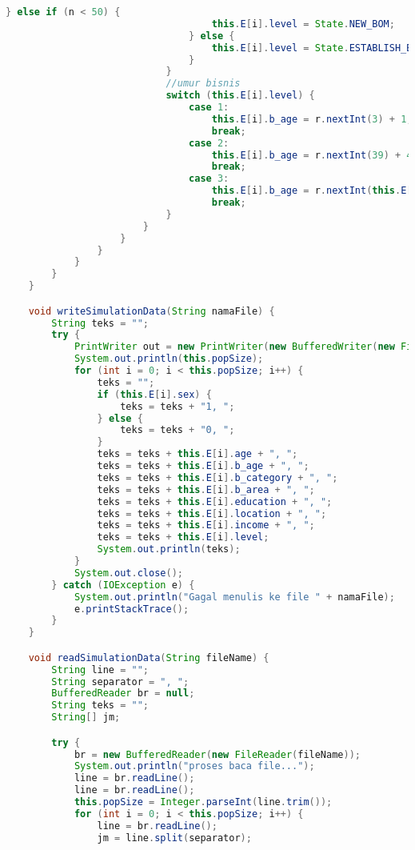 \begin{lstlisting}[language=Java, caption=CA.java]
                                } else if (n < 50) {
                                    this.E[i].level = State.NEW_BOM;
                                } else {
                                    this.E[i].level = State.ESTABLISH_BOM;
                                }
                            }
                            //umur bisnis
                            switch (this.E[i].level) {
                                case 1:
                                    this.E[i].b_age = r.nextInt(3) + 1;
                                    break;
                                case 2:
                                    this.E[i].b_age = r.nextInt(39) + 4;
                                    break;
                                case 3:
                                    this.E[i].b_age = r.nextInt(this.E[i].age = 18 * 12) + 1;
                                    break;
                            }
                        }
                    }
                }
            }
        }
    }

    void writeSimulationData(String namaFile) {
        String teks = "";
        try {
            PrintWriter out = new PrintWriter(new BufferedWriter(new FileWriter(namaFile, true)));
            System.out.println(this.popSize);
            for (int i = 0; i < this.popSize; i++) {
                teks = "";
                if (this.E[i].sex) {
                    teks = teks + "1, ";
                } else {
                    teks = teks + "0, ";
                }
                teks = teks + this.E[i].age + ", ";
                teks = teks + this.E[i].b_age + ", ";
                teks = teks + this.E[i].b_category + ", ";
                teks = teks + this.E[i].b_area + ", ";
                teks = teks + this.E[i].education + ", ";
                teks = teks + this.E[i].location + ", ";
                teks = teks + this.E[i].income + ", ";
                teks = teks + this.E[i].level;
                System.out.println(teks);
            }
            System.out.close();
        } catch (IOException e) {
            System.out.println("Gagal menulis ke file " + namaFile);
            e.printStackTrace();
        }
    }

    void readSimulationData(String fileName) {
        String line = "";
        String separator = ", ";
        BufferedReader br = null;
        String teks = "";
        String[] jm;

        try {
            br = new BufferedReader(new FileReader(fileName));
            System.out.println("proses baca file...");
            line = br.readLine();
            line = br.readLine();
            this.popSize = Integer.parseInt(line.trim());
            for (int i = 0; i < this.popSize; i++) {
                line = br.readLine();
                jm = line.split(separator);


\end{lstlisting}
